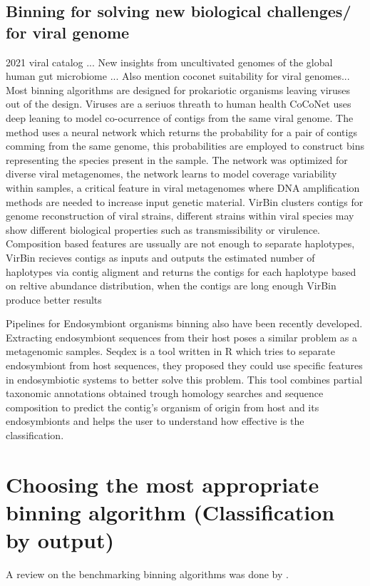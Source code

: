 \documentclass{article}
\begin{document}
\subsection*{Binning for solving new biological challenges/ for viral genome}
2021 viral catalog \cite{nayfach2021metagenomic}...
New insights from uncultivated genomes of the global human gut microbiome \cite{nayfach2019new}...
Also mention coconet suitability for viral genomes...
Most binning algorithms are designed for prokariotic organisms leaving viruses out of the design. Viruses are a seriuos threath to human health
CoCoNet uses deep leaning to model co-ocurrence of contigs from the same viral genome. The method uses a neural network which returns the probability for a pair of contigs comming  from the same genome, this probabilities are employed to construct bins representing the species present in the sample. The network was optimized for diverse viral metagenomes, the network learns to model coverage variability within samples, a critical feature in viral metagenomes where DNA amplification methods are needed to increase input genetic material.
VirBin clusters contigs for genome reconstruction of viral strains, different strains within viral species may show different biological properties such as transmissibility or virulence. Composition based features are ussually are not enough to separate haplotypes, VirBin recieves contigs as inputs  and outputs the estimated number of haplotypes via contig aligment and returns the contigs for each haplotype based on reltive abundance distribution, when the contigs are long enough VirBin produce better results

Pipelines for Endosymbiont organisms binning also have been recently developed. Extracting endosymbiont sequences from their host poses a similar problem as a metagenomic samples.  
Seqdex is a tool written in R which tries to separate endosymbiont from host sequences, they proposed they could use specific features in endosymbiotic systems to better solve this problem. This tool combines partial taxonomic annotations obtained trough homology searches and sequence composition to predict the contig's organism of origin from host and its endosymbionts and helps the user to understand how effective is the classification.

\section*{Choosing the most appropriate binning algorithm (Classification by output)}
A review on the benchmarking binning algorithms was done by .
\end{document}

